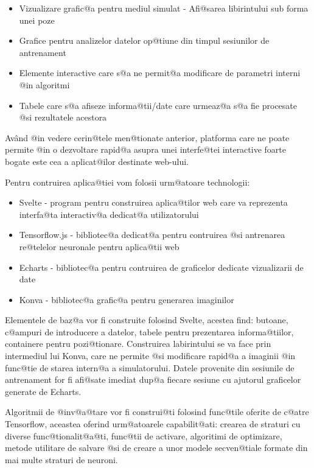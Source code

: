 \begin{itemize}
	\item Vizualizare grafic@a pentru mediul simulat - Afi@sarea libirintului sub forma unei poze
	\item Grafice pentru analizelor datelor op@tiune din timpul sesiunilor de antrenament
	\item Elemente interactive care s@a ne permit@a modificare de parametri interni @in algoritmi
	\item Tabele care s@a afiseze informa@tii/date care urmeaz@a s@a fie procesate @si rezultatele acestora
\end{itemize}

Av\^ and @in vedere cerin@tele men@tionate anterior, platforma care ne poate permite @in o dezvoltare rapid@a asupra unei interfe@tei interactive foarte bogate este cea a aplicat@ilor destinate web-ului.

Pentru contruirea aplica@tiei vom folosii urm@atoare technologii:

\begin{itemize}
	\item Svelte - program pentru construirea aplica@tilor web care va reprezenta interfa@ta interactiv@a dedicat@a utilizatorului \cite{Svelte}
	\item Tensorflow.js - bibliotec@a dedicat@a pentru contruirea @si antrenarea re@telelor neuronale pentru aplica@tii web \cite{TensorflowJs}
	\item Echarts - bibliotec@a pentru contruirea de graficelor dedicate vizualizarii de date \cite{Echarts}
	\item Konva - bibliotec@a grafic@a pentru generarea imaginilor \cite{Konva}
\end{itemize} 

Elementele de baz@a vor fi construite folosind Svelte, acestea find: butoane, c@ampuri de introducere a datelor, tabele pentru prezentarea informa@tiilor, containere pentru pozi@tionare. Construirea labirintului se va face prin intermediul lui Konva, care ne permite @si modificare rapid@a a imaginii @in func@tie de starea intern@a a simulatorului. Datele provenite din sesiunile de antrenament for fi afi@sate imediat dup@a fiecare sesiune cu ajutorul graficelor generate de Echarts.

Algoritmii de @inv@a@tare vor fi construi@ti folosind func@tile oferite de c@atre Tensorflow, aceastea oferind urm@atoarele capabilit@ati: crearea de straturi cu diverse func@tionalit@a@ti, func@tii de activare, algoritimi de optimizare, metode utilitare de salvare @si de creare a unor modele secven@tiale formate din mai multe straturi de neuroni.

